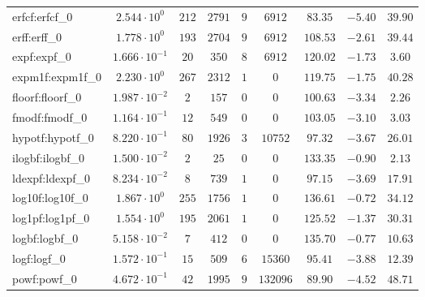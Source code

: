 \begin{tabular}{|l|c|c|c|c|c|c|c|c|}
erfcf:erfcf\_0               & $ 2.544 \cdot 10^{0}  $ & $ 212    $ & $ 2791  $ & $ 9   $ & $ 6912   $ & $ 83.35       $ & $ -5.40   $ & $ 39.90   $ \\
erff:erff\_0                 & $ 1.778 \cdot 10^{0}  $ & $ 193    $ & $ 2704  $ & $ 9   $ & $ 6912   $ & $ 108.53      $ & $ -2.61   $ & $ 39.44   $ \\
expf:expf\_0                 & $ 1.666 \cdot 10^{-1} $ & $ 20     $ & $ 350   $ & $ 8   $ & $ 6912   $ & $ 120.02      $ & $ -1.73   $ & $ 3.60    $ \\
expm1f:expm1f\_0             & $ 2.230 \cdot 10^{0}  $ & $ 267    $ & $ 2312  $ & $ 1   $ & $ 0      $ & $ 119.75      $ & $ -1.75   $ & $ 40.28   $ \\
floorf:floorf\_0             & $ 1.987 \cdot 10^{-2} $ & $ 2      $ & $ 157   $ & $ 0   $ & $ 0      $ & $ 100.63      $ & $ -3.34   $ & $ 2.26    $ \\
fmodf:fmodf\_0               & $ 1.164 \cdot 10^{-1} $ & $ 12     $ & $ 549   $ & $ 0   $ & $ 0      $ & $ 103.05      $ & $ -3.10   $ & $ 3.03    $ \\
hypotf:hypotf\_0             & $ 8.220 \cdot 10^{-1} $ & $ 80     $ & $ 1926  $ & $ 3   $ & $ 10752  $ & $ 97.32       $ & $ -3.67   $ & $ 26.01   $ \\
ilogbf:ilogbf\_0             & $ 1.500 \cdot 10^{-2} $ & $ 2      $ & $ 25    $ & $ 0   $ & $ 0      $ & $ 133.35      $ & $ -0.90   $ & $ 2.13    $ \\
ldexpf:ldexpf\_0             & $ 8.234 \cdot 10^{-2} $ & $ 8      $ & $ 739   $ & $ 1   $ & $ 0      $ & $ 97.15       $ & $ -3.69   $ & $ 17.91   $ \\
log10f:log10f\_0             & $ 1.867 \cdot 10^{0}  $ & $ 255    $ & $ 1756  $ & $ 1   $ & $ 0      $ & $ 136.61      $ & $ -0.72   $ & $ 34.12   $ \\
log1pf:log1pf\_0             & $ 1.554 \cdot 10^{0}  $ & $ 195    $ & $ 2061  $ & $ 1   $ & $ 0      $ & $ 125.52      $ & $ -1.37   $ & $ 30.31   $ \\
logbf:logbf\_0               & $ 5.158 \cdot 10^{-2} $ & $ 7      $ & $ 412   $ & $ 0   $ & $ 0      $ & $ 135.70      $ & $ -0.77   $ & $ 10.63   $ \\
logf:logf\_0                 & $ 1.572 \cdot 10^{-1} $ & $ 15     $ & $ 509   $ & $ 6   $ & $ 15360  $ & $ 95.41       $ & $ -3.88   $ & $ 12.39   $ \\
powf:powf\_0                 & $ 4.672 \cdot 10^{-1} $ & $ 42     $ & $ 1995  $ & $ 9   $ & $ 132096 $ & $ 89.90       $ & $ -4.52   $ & $ 48.71   $ \\

\end{tabular}
